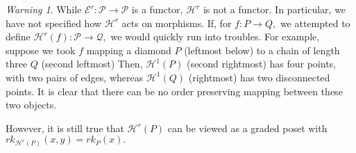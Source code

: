 \documentclass[10 pt]{amsart}
\theoremstyle{plain}
\theoremstyle{definition}
\theoremstyle{remark}
\numberwithin{equation}{section}
\theoremstyle{remark}
\newtheorem{warning}[thm]{Warning}
\begin{document}



\begin{warning}
While $\mathcal E^r:\mathcal P \rightarrow \mathcal P$ is a functor, $\mathcal H^r$ is not a functor. In particular, we have not specified how $\mathcal H^r$ acts on morphisms. If, for $f:P \rightarrow Q,$ we attempted to define $\mathcal H^r(f):\mathcal P \rightarrow \mathcal Q,$ we would quickly run into troubles. For example, suppose we took $f$ mapping a diamond $P$ (leftmost below) to a chain of length three $Q$ (second leftmost) Then, $\mathcal H^1(P)$ (second rightmost) has four points, with two pairs of edges, whereas $\mathcal H^1(Q)$ (rightmost) has two disconnected points. It is clear that there can be no order preserving mapping between these two objects. 

However, it is still true that $\mathcal H^r(P)$ can be viewed as a graded poset with $rk_{\mathcal H^r(P)}(x, y) = rk_P(x).$
\end{warning}
\end{document}
